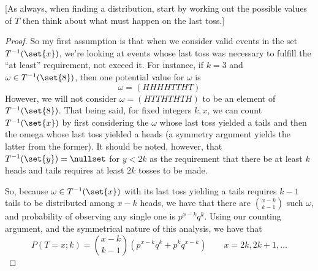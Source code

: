 \documentclass[12pt,titlepage]{article}
\begin{document}
[\Hint As always, when finding a distribution, start by working out the possible values of $T$ then think about what must happen on the last toss.]

\begin{proof}
So my first assumption is that when we consider valid events in the set $T^{-1}(\set{x})$, we're looking at events whose last toss was necessary to fulfill the ``at least'' requirement, not exceed it. For instance, if $k=3$ and $\omega \in T^{-1}(\set{8})$, then one potential value for $\omega$ is
\[
\omega = (HHHHTTHT)
\]
However, we will not consider $\omega = (HTTHTHTH)$ to be an element of $T^{-1}(\set{8})$. That being said, for fixed integers $k,x$, we can count $T^{-1}(\set{x})$ by first considering the $\omega$ whose last toss yielded a tails and then the omega whose last toss yielded a heads (a symmetry argument yields the latter from the former). It should be noted, however, that $T^{-1}(\set{y}) = \nullset$ for $ y < 2k$ as the requirement that there be at least $k$ heads and tails requires at least $2k$ tosses to be made.

So, because $\omega \in T^{-1}(\set{x})$ with its last toss yielding a tails requires $k-1$ tails to be distributed among $x-k$ heads, we have that there are $\binom{x-k}{k-1}$ such $\omega$, and probability of observing any single one is $p^{x-k}q^{k}$. Using our counting argument, and the symmetrical nature of this analysis, we have that
\[
P(T = x;k) = \binom{x-k}{k-1}\left(p^{x-k}q^{k} + p^{k}q^{x-k}\right) \qquad x = 2k, 2k+1, \ldots
\]

\end{proof}
\end{document}
